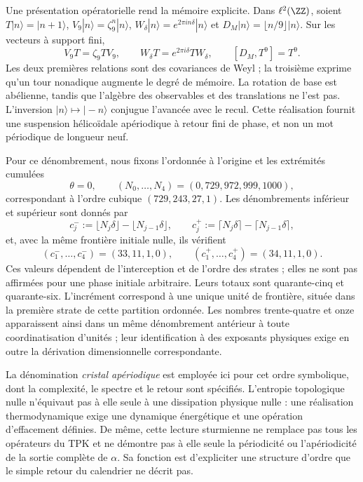 Une présentation opératorielle rend la mémoire explicite. Dans \(\ell^2(\ZZ)\), soient \(T|n\rangle=|n+1\rangle\), \(V_9|n\rangle=\zeta_9^n|n\rangle\), \(W_\delta|n\rangle=e^{2\pi i n\delta}|n\rangle\) et \(D_M|n\rangle=\lfloor n/9\rfloor|n\rangle\). Sur les vecteurs à support fini,
\begin{equation}
 V_9T=\zeta_9TV_9,\qquad
 W_\delta T=e^{2\pi i\delta}TW_\delta,\qquad
 [D_M,T^9]=T^9.
 \label{eq:weyl-relojes}
\end{equation}
Les deux premières relations sont des covariances de Weyl ; la troisième exprime qu'un tour nonadique augmente le degré de mémoire. La rotation de base est abélienne, tandis que l'algèbre des observables et des translations ne l'est pas. L'inversion \(|n\rangle\mapsto|-n\rangle\) conjugue l'avancée avec le recul. Cette réalisation fournit une suspension hélicoïdale apériodique à retour fini de phase, et non un mot périodique de longueur neuf.



Pour ce dénombrement, nous fixons l’ordonnée à l’origine et les extrémités cumulées
\[
 \theta=0,\qquad
 (N_0,\ldots,N_4)=(0,729,972,999,1000),
\]
correspondant à l’ordre cubique \((729,243,27,1)\). Les dénombrements inférieur et
supérieur sont donnés par
\[
 c_j^-:=\lfloor N_j\delta\rfloor-\lfloor N_{j-1}\delta\rfloor,
 \qquad
 c_j^+:=\lceil N_j\delta\rceil-\lceil N_{j-1}\delta\rceil,
\]
et, avec la même frontière initiale nulle, ils vérifient
\[
 (c_1^-,\ldots,c_4^-)=(33,11,1,0),\qquad
 (c_1^+,\ldots,c_4^+)=(34,11,1,0).
\]
Ces valeurs dépendent de l'interception et de l'ordre des strates ; elles ne sont pas affirmées pour une phase initiale arbitraire. Leurs totaux sont quarante-cinq et quarante-six. L'incrément correspond à une unique unité de frontière, située dans la première strate de cette partition ordonnée. Les nombres trente-quatre et onze apparaissent ainsi dans un même dénombrement antérieur à toute coordinatisation d'unités ; leur identification à des exposants physiques exige en outre la dérivation dimensionnelle correspondante.

La dénomination \emph{cristal apériodique} est employée ici pour cet ordre symbolique, dont la complexité, le spectre et le retour sont spécifiés. L'entropie topologique nulle n'équivaut pas à elle seule à une dissipation physique nulle : une réalisation thermodynamique exige une dynamique énergétique et une opération d'effacement définies. De même, cette lecture sturmienne ne remplace pas tous les opérateurs du TPK et ne démontre pas à elle seule la périodicité ou l'apériodicité de la sortie complète de \(\alpha\). Sa fonction est d'expliciter une structure d'ordre que le simple retour du calendrier ne décrit pas.




